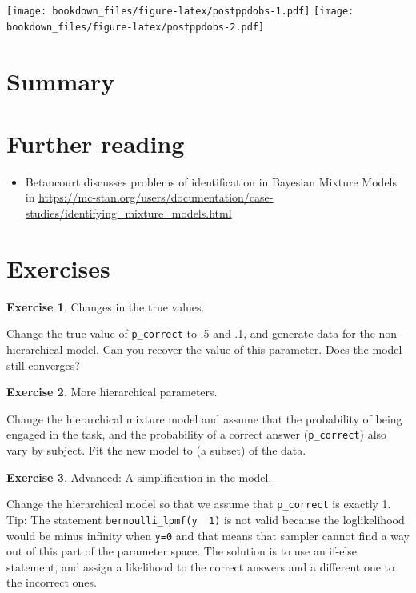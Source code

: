 \documentclass[12pt,]{krantz}
\providecommand{\tightlist}{%
  \setlength{\itemsep}{0pt}\setlength{\parskip}{0pt}}
\theoremstyle{definition}
\theoremstyle{definition}
\theoremstyle{definition}
\newtheorem{exercise}{Exercise}[chapter]
\theoremstyle{remark}
\begin{document}
\texttt{[image: bookdown\_files/figure-latex/postppdobs-1.pdf]}
\texttt{[image: bookdown\_files/figure-latex/postppdobs-2.pdf]}

\section{Summary}\label{summary-8}

\section{Further reading}\label{further-reading-12}

\begin{itemize}
\tightlist
\item
  Betancourt discusses problems of identification in Bayesian Mixture
  Models in
  \url{https://mc-stan.org/users/documentation/case-studies/identifying_mixture_models.html}
\end{itemize}

\section{Exercises}\label{exercises-10}

\begin{exercise}
\protect\hypertarget{exr:pcorrect}{}{\label{exr:pcorrect} }Changes in the
true values. \end{exercise}

Change the true value of \texttt{p\_correct} to .5 and .1, and generate
data for the non-hierarchical model. Can you recover the value of this
parameter. Does the model still converges?

\begin{exercise}
\protect\hypertarget{exr:mixhier}{}{\label{exr:mixhier} }More hierarchical
parameters. \end{exercise}

Change the hierarchical mixture model and assume that the probability of
being engaged in the task, and the probability of a correct answer
(\texttt{p\_correct}) also vary by subject. Fit the new model to (a
subset) of the data.

\begin{exercise} \protect\hypertarget{exr:simp}{}{\label{exr:simp}
}Advanced: A simplification in the model. \end{exercise}

Change the hierarchical model so that we assume that \texttt{p\_correct}
is exactly 1. Tip: The statement
\texttt{bernoulli\_lpmf(y\ \textbar{}\ 1)} is not valid because the
loglikelihood would be minus infinity when \texttt{y=0} and that means
that sampler cannot find a way out of this part of the parameter space.
The solution is to use an if-else statement, and assign a likelihood to
the correct answers and a different one to the incorrect ones.
\end{document}
